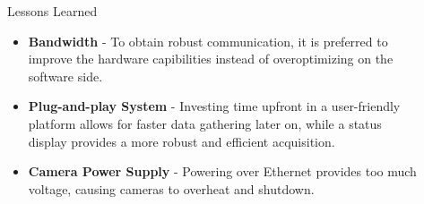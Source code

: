 \documentclass[final,hyperref={pdfpagelabels=false}]{beamer}
\begin{document}
\begin{frame}[t]
\begin{columns}[t]
\begin{column}{.465\textwidth}

\end{column} %

\begin{column}{.03\textwidth}\end{column} %
 
\begin{column}{.465\textwidth} %


\vspace{-12.5mm}
\begin{block}{Lessons Learned}
	\begin{itemize}
		\item \textbf{Bandwidth} - To obtain robust communication, it is preferred to improve the hardware capibilities instead of overoptimizing on the software side.
		\item \textbf{Plug-and-play System} -  Investing time upfront in a user-friendly platform allows for faster data gathering later on, while a status display provides a more robust and efficient acquisition. 
		\item \textbf{Camera Power Supply} - Powering over Ethernet provides too much voltage, causing cameras to overheat and shutdown.
	\end{itemize}
\end{block}



\end{column}
\end{columns}
\end{frame}
\end{document}
